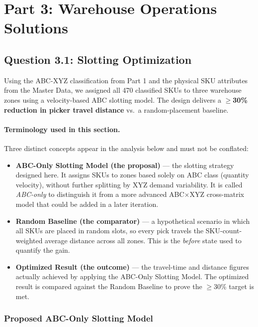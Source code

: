 \documentclass[11pt]{article}
\author{}
\date{}
\begin{document}
\section{Part 3: Warehouse Operations Solutions}\label{part3}

\subsection{Question 3.1: Slotting Optimization}\label{q3.1}

Using the ABC-XYZ classification from Part 1 and the physical SKU attributes from the
Master Data, we assigned all 470 classified SKUs to three warehouse zones using a
velocity-based ABC slotting model. The design delivers a
\textbf{$\geq$30\% reduction in picker travel distance} vs.\ a random-placement baseline.

\paragraph{Terminology used in this section.}
Three distinct concepts appear in the analysis below and must not be conflated:
\begin{itemize}
    \item \textbf{ABC-Only Slotting Model (the proposal)} --- the slotting strategy designed here.
          It assigns SKUs to zones based solely on ABC class (quantity velocity), without further
          splitting by XYZ demand variability. It is called \emph{ABC-only} to distinguish it from
          a more advanced ABC$\times$XYZ cross-matrix model that could be added in a later iteration.
    \item \textbf{Random Baseline (the comparator)} --- a hypothetical scenario in which all
          SKUs are placed in random slots, so every pick travels the SKU-count-weighted average
          distance across all zones. This is the \emph{before} state used to quantify the gain.
    \item \textbf{Optimized Result (the outcome)} --- the travel-time and distance figures
          actually achieved by applying the ABC-Only Slotting Model. The optimized result is
          compared against the Random Baseline to prove the $\geq$30\% target is met.
\end{itemize}

\subsubsection{Proposed ABC-Only Slotting Model}\label{model1}
\end{document}
